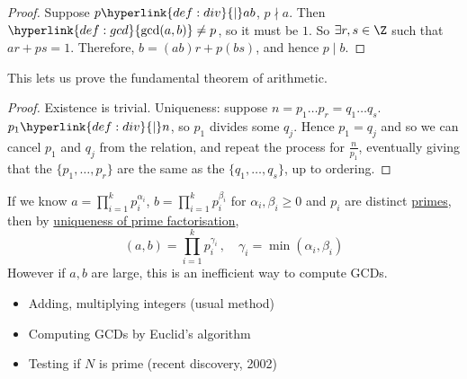 \documentclass{article}
\begin{document}
\begin{proof}
    Suppose $p \hyperlink{def:div}{\mid} ab$, $p \nmid a$.
    Then $\hyperlink{def:gcd}{\gcd(a, b)} \ne p$, so it must be $1$.
    So $\exists r, s \in \Z$ such that $ar + ps = 1$.
    Therefore, $b = (ab) r + p(bs)$, and hence $p \mid b$.
\end{proof}

This lets us prove the fundamental theorem of arithmetic.
\begin{proof}
    Existence is trivial.
    Uniqueness: suppose $n = p_1 \dots p_r = q_1 \dots q_s$.
    $p_1 \hyperlink{def:div}{\mid} n$, so $p_1$ divides some $q_j$.
    Hence $p_1 = q_j$ and so we can cancel $p_1$ and $q_j$ from the relation, and repeat the process for $\frac{n}{p_1}$, eventually giving that the $\{p_1, \dots, p_r\}$ are the same as the $\{q_1, \dots, q_s\}$, up to ordering.
\end{proof}


If we know $a = \prod_{i=1}^k p_i^{\alpha_i}$, $b = \prod_{i=1}^k p_i^{\beta_i}$ for $\alpha_i, \beta_i \geq 0$ and $p_i$ are distinct \hyperlink{def:prime}{primes}, then by \hyperlink{thm:fta}{uniqueness of prime factorisation},
\begin{equation*}
    (a, b) = \prod_{i=1}^k p_i^{\gamma_i} \, , \quad \gamma_i = \min(\alpha_i, \beta_i)
\end{equation*}
However if $a, b$ are large, this is an inefficient way to compute GCDs.

\begin{eg}\leavevmode
    \begin{itemize}
        \item Adding, multiplying integers (usual method)
        \item Computing GCDs by Euclid's algorithm
        \item Testing if $N$ is prime (recent discovery, 2002)
    \end{itemize}
\end{eg}
\end{document}
